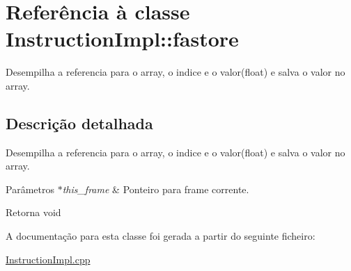 \hypertarget{class_instruction_impl_1_1fastore}{}\section{Referência à classe Instruction\+Impl\+:\+:fastore}
\label{class_instruction_impl_1_1fastore}


Desempilha a referencia para o array, o indice e o valor(float) e salva o valor no array.  




\subsection{Descrição detalhada}
Desempilha a referencia para o array, o indice e o valor(float) e salva o valor no array. 


\begin{DoxyParams}{Parâmetros}
{\em $\ast$this\+\_\+frame} & Ponteiro para frame corrente. \\
\hline
\end{DoxyParams}
\begin{DoxyReturn}{Retorna}
void 
\end{DoxyReturn}


A documentação para esta classe foi gerada a partir do seguinte ficheiro\+:\begin{DoxyCompactItemize}
\item 
\hyperlink{_instruction_impl_8cpp}{Instruction\+Impl.\+cpp}\end{DoxyCompactItemize}
